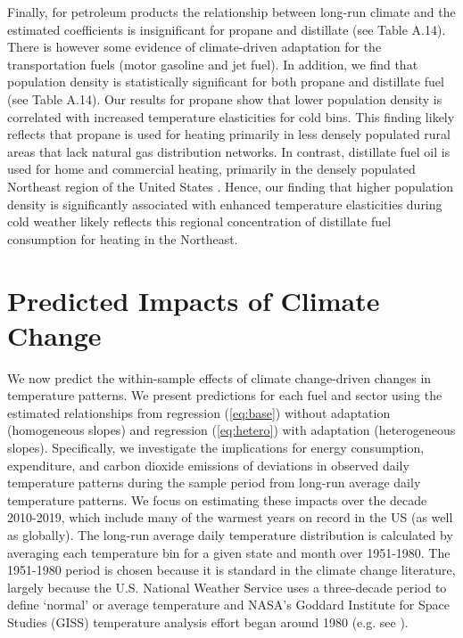 \documentclass[11pt]{article}
\begin{document}
Finally, for petroleum products the relationship between long-run climate and the estimated coefficients is insignificant for propane and distillate (see Table A.14). There is however some evidence of climate-driven adaptation for the transportation fuels (motor gasoline and jet fuel). In addition, we find that population density is statistically significant for both propane and distillate fuel (see Table A.14). Our results for propane show that lower population density is correlated with increased temperature elasticities for cold bins. This finding likely reflects that propane is used for heating primarily in less densely populated rural areas that lack natural gas distribution networks. In contrast, distillate fuel oil is used for home and commercial heating, primarily in the densely populated Northeast region of the United States \citep{EIA2023}. Hence, our finding that higher population density is significantly associated with enhanced temperature elasticities during cold weather likely reflects this regional concentration of distillate fuel consumption for heating in the Northeast.

\section{Predicted Impacts of Climate Change \label{simulation}}

We now predict the within-sample effects of climate change-driven changes in temperature patterns. We present predictions for each fuel and sector using the estimated relationships from regression (\ref{eq:base}) without adaptation (homogeneous slopes) and regression (\ref{eq:hetero}) with adaptation (heterogeneous slopes). Specifically, we investigate the implications for energy consumption, expenditure, and carbon dioxide emissions of deviations in observed daily temperature patterns during the sample period from long-run average daily temperature patterns. We focus on estimating these impacts over the decade 2010-2019, which include many of the warmest years on record in the US (as well as globally). The long-run average daily temperature distribution is calculated by averaging each temperature bin for a given state and month over 1951-1980. The 1951-1980 period is chosen because it is standard in the climate change literature, largely because the U.S. National Weather Service uses a three-decade period to define `normal' or average temperature and NASA's Goddard Institute for Space Studies (GISS) temperature analysis effort began around 1980 (e.g. see \cite{NASA2020}). 
\end{document}
